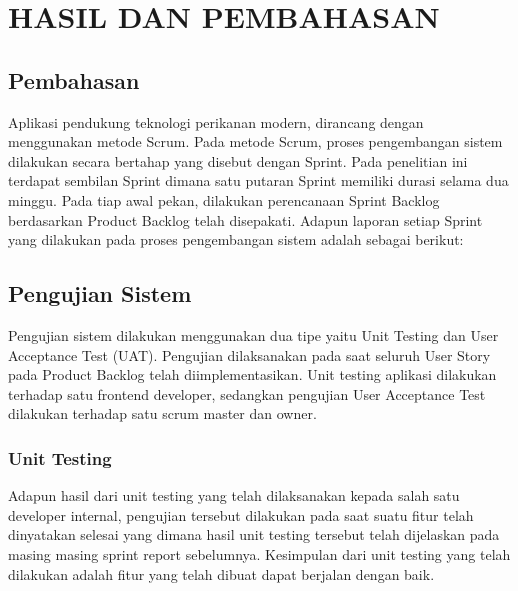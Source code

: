
\chapter{HASIL DAN PEMBAHASAN}

\section{Pembahasan}

Aplikasi pendukung teknologi perikanan modern, dirancang dengan menggunakan metode Scrum. Pada metode Scrum, proses pengembangan sistem dilakukan secara bertahap yang disebut dengan Sprint. Pada penelitian ini terdapat sembilan Sprint dimana satu putaran Sprint memiliki durasi selama dua minggu. Pada tiap awal pekan, dilakukan perencanaan Sprint Backlog berdasarkan Product Backlog telah disepakati. Adapun laporan setiap Sprint yang dilakukan pada proses pengembangan sistem adalah sebagai berikut:













\section{Pengujian Sistem}
Pengujian sistem dilakukan menggunakan dua tipe yaitu Unit Testing dan User Acceptance Test (UAT). Pengujian dilaksanakan pada saat seluruh User Story pada Product Backlog telah diimplementasikan. Unit testing aplikasi dilakukan terhadap satu frontend developer, sedangkan pengujian User Acceptance Test dilakukan terhadap satu scrum master dan owner.

\subsection {Unit Testing}

Adapun hasil dari unit testing yang telah dilaksanakan kepada salah satu developer internal, pengujian tersebut dilakukan pada saat suatu fitur telah dinyatakan selesai yang dimana hasil unit testing tersebut telah dijelaskan pada masing masing sprint report sebelumnya. Kesimpulan dari unit testing yang telah dilakukan adalah fitur yang telah dibuat dapat berjalan dengan baik.

